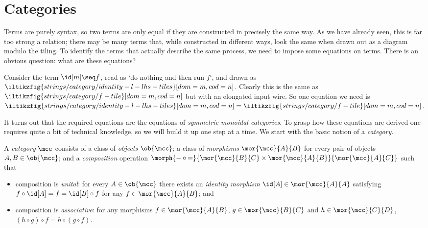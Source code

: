 \section{Categories}\label{sec:categories}

Terms are purely syntax, so two terms are only equal if they are constructed in
precisely the same way.
As we have already seen, this is far too strong a relation; there may be
many terms that, while constructed in different ways, look the same when drawn
out as a diagram modulo the tiling.
To identify the terms that actually describe the same process, we need to impose
some equations on terms.
There is an obvious question: what are these equations?

\begin{example}
    Consider the term \(\id[m] \seq f\), read as `do nothing and
    then run \(f\)`, and drawn as \(
    \iltikzfig{strings/category/identity-l-lhs-tiles}[dom=m,cod=n]
    \).
    Clearly this is the same as \(
    \iltikzfig{strings/category/f-tile}[dom=m,cod=n]
    \) but with an elongated input wire.
    So one equation we need is \(
    \iltikzfig{strings/category/identity-l-lhs-tiles}[dom=m,cod=n]
    =
    \iltikzfig{strings/category/f-tile}[dom=m,cod=n]
    \).
\end{example}

It turns out that the required equations are the equations of
\emph{symmetric monoidal categories}.
To grasp how these equations are derived one requires quite a
bit of technical knowledge, so we will build it up one step at a time.
We start with the basic notion of a \emph{category}.

\begin{definition}[Category]
    \label{def:category}
    A \emph{category} \(\mcc\) consists of a class of \emph{objects}
    \(\ob{\mcc}\); a class of \emph{morphisms} \(\mor{\mcc}{A}{B}\)
    for every pair of objects \(A, B \in \ob{\mcc}\); and a \emph{composition}
    operation \(
    \morph{
        {-} \circ {=}
    }{
        \mor{\mcc}{B}{C} \times \mor{\mcc}{A}{B}
    }{
        \mor{\mcc}{A}{C}
    }
    \) such that
    \begin{itemize}
        \item composition is \emph{unital}: for every \(
              A \in \ob{\mcc}
              \) there exists an \emph{identity morphism} \(
              \id[A] \in \mor{\mcc}{A}{A}
              \) satisfying \(
              f \circ \id[A] = f = \id[B] \circ f
              \) for any \(
              f \in \mor{\mcc}{A}{B}
              \); and
        \item composition is \emph{associative}: for any morphisms \(
              f \in \mor{\mcc}{A}{B}
              \), \(
              g \in \mor{\mcc}{B}{C}
              \) and \(h \in \mor{\mcc}{C}{D}\), \(
              (h \circ g) \circ f = h \circ (g \circ f).
              \)
    \end{itemize}
\end{definition}


